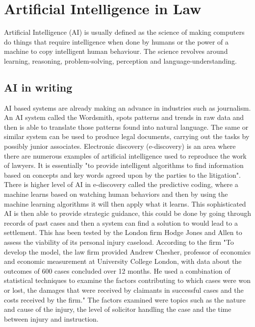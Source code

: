 \documentclass[12pt]{article}
\begin{document}
\section{Artificial Intelligence in Law}
Artificial Intelligence (AI) is usually defined as the science of making computers do things that require intelligence when done by humans or the power of a machine to copy intelligent human behaviour. The science revolves around learning, reasoning, problem-solving, perception and language-understanding.

\subsection{AI in writing}
AI based systems are already making an advance in industries such as journalism. An AI system called the Wordsmith, spots patterns and trends in raw data and then is able to translate those patterns found into natural language. The same or similar system can be used to produce legal documents, carrying out the tasks by possibly junior associates. 
\newline
\newline
Electronic discovery (e-discovery) is an area where there are numerous examples of artificial intelligence used to reproduce the work of lawyers. It is essentially "to provide intelligent algorithms to find information based on concepts and key words agreed upon by the parties to the litigation". There is higher level of AI in e-discovery called the predictive coding, where a machine learns based on watching human behaviors and then by using the machine learning algorithms it will then apply what it learns. This sophisticated AI is then able to provide strategic guidance, this could be done by going through records of past cases and then a system can find a solution to would lead to a settlement. This has been tested by the London firm Hodge Jones and Allen to assess the viability of its personal injury caseload. 
\newline
\newline
According to the firm "To develop the model, the law firm provided Andrew Chesher, professor of economics and economic measurement at University College London, with data about the outcomes of 600 cases concluded over 12 months. He used a combination of statistical techniques to examine the factors contributing to which cases were won or lost, the damages that were received by claimants in successful cases and the costs received by the firm." The factors examined were topics such as the nature and cause of the injury, the level of solicitor handling the case and the time between injury and instruction.
\end{document}
